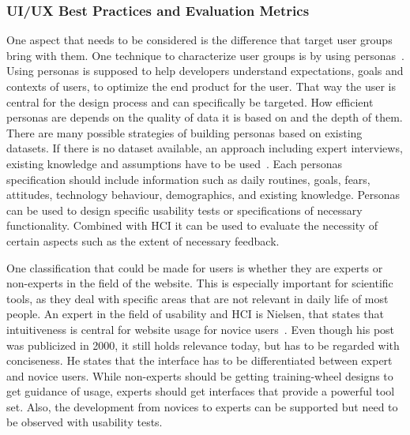 \subsubsection*{UI/UX Best Practices and Evaluation Metrics}


One aspect that needs to be considered is the difference that target user groups bring with them. One technique to characterize user groups is by using personas~\cite{billestrup_persona_2014}. Using personas is supposed to help developers understand expectations, goals and contexts of users, to optimize the end product for the user.
That way the user is central for the design process and can specifically be targeted. How efficient personas are depends on the quality of data it is based on and the depth of them.
There are many possible strategies of building personas based on existing datasets. If there is no dataset available, an approach including expert interviews, existing knowledge and assumptions have to be used~\cite{pruitt_personas_2003}. 
Each personas specification should include information such as daily routines, goals, fears, attitudes, technology behaviour, demographics, and existing knowledge.
Personas can be used to design specific usability tests or specifications of necessary functionality. 
Combined with \ac{HCI} it can be used to evaluate the necessity of certain aspects such as the extent of necessary feedback.

One classification that could be made for users is whether they are experts or non-experts in the field of the website. This is especially important for scientific tools, as they deal with specific areas that are not relevant in daily life of most people.
An expert in the field of usability and \ac{HCI} is Nielsen, that states that intuitiveness is central for website usage for novice users~\cite{nielsen_differences_2006}. Even though his post was publicized in 2000, it still holds relevance today, but has to be regarded with conciseness. 
He states that the interface has to be differentiated between expert and novice users. While non-experts should be getting training-wheel designs to get guidance of usage, experts should get interfaces that provide a powerful tool set.
Also, the development from novices to experts can be supported but need to be observed with usability tests.

